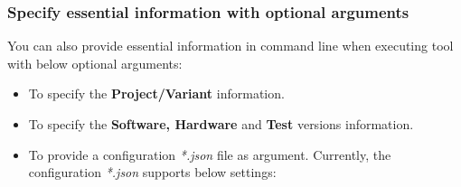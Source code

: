  \hypertarget{optional-arguments}{%
  \subsubsection{Specify essential information with optional arguments}
  \label{optional-arguments}}
    You can also provide essential information in command line when executing 
    \pkg tool with below optional arguments:

      \begin{itemize}
        \item {}
          To specify the \textbf{Project/Variant} information.
        
        \item {}
          To specify the \textbf{Software, Hardware} and \textbf{Test} versions 
          information.
        
        \item {}
          To provide a configuration \emph{*.json} file as  argument.
          Currently, the configuration \emph{*.json} supports below settings:
        

\end{itemize}
